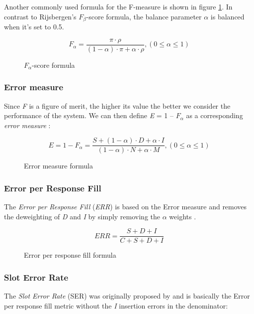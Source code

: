 Another commonly used formula for the F-measure is shown in figure \ref{fig:falpha-score}. In contrast to Rijsbergen's $F_\beta$-score formula, the balance parameter $\alpha$ is balanced when it's set to 0.5.

\begin{figure}[H]
\begin{displaymath}
	F_\alpha = \frac{\pi \cdot \rho}{(1-\alpha) \cdot \pi + \alpha \cdot \rho}, (0 \le \alpha \le 1)
\end{displaymath}
\caption{$\textit{F}_\alpha$-score formula \cite{Makhoul:1999}}
\label{fig:falpha-score}
\end{figure}

\subsubsection{Error measure}
Since \textit{F} is a figure of merit, the higher its value the better we consider the performance of the system. We can then define \textit{E} = 1 – $F_\alpha$ as a corresponding \textit{error measure} \cite{Makhoul:1999}:

\begin{figure}[H]
\begin{displaymath}
	E = 1 - F_\alpha = \frac{S + (1-\alpha) \cdot D + \alpha \cdot I}{(1-\alpha) \cdot N + \alpha \cdot M}, (0 \le \alpha \le 1)
\end{displaymath}
\caption{Error measure formula}
\label{eq:error-measure}
\end{figure}

\subsubsection{Error per Response Fill}
The \textit{Error per Response Fill} (\textit{ERR}) is based on the Error measure and removes the deweighting of \textit{D} and \textit{I} by simply removing the $\alpha$ weights \cite{Chinchor:1995}\cite{Makhoul:1999}.

\begin{figure}[H]
\begin{displaymath}
	ERR = \frac{S+D+I}{C+S+D+I}
\end{displaymath}
\caption{Error per response fill formula}
\label{eq:error-per-response-fill}
\end{figure}

\subsubsection{Slot Error Rate}
The \textit{Slot Error Rate} (SER) was originally proposed by \citeauthor{Makhoul:1999} \cite{Makhoul:1999} and is basically the Error per response fill metric without the \textit{I} insertion errors in the denominator:

